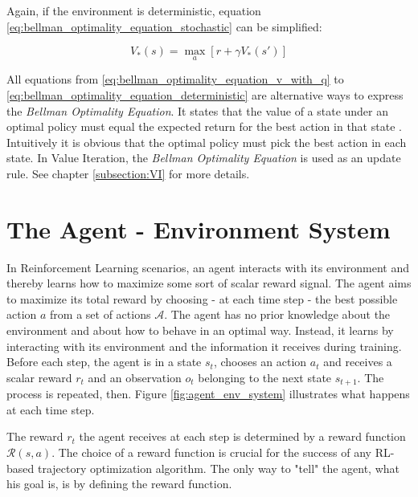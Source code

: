 Again, if the environment is deterministic, equation \ref{eq:bellman_optimality_equation_stochastic} can be simplified:

\begin{equation}
V_*(s) = \max_a[r+\gamma V_*(s')]
\label{eq:bellman_optimality_equation_deterministic}
\end{equation}

All equations from \ref{eq:bellman_optimality_equation_v_with_q} to \ref{eq:bellman_optimality_equation_deterministic} are alternative ways to express the \textit{Bellman Optimality Equation}. It states that the value of a state under an optimal policy must equal the expected return for the best action in that state \cite{SuttonBarto2018}. Intuitively it is obvious that the optimal policy must pick the best action in each state. In Value Iteration, the \textit{Bellman Optimality Equation} is used as an update rule. See chapter \ref{subsection:VI} for more details.

\section{The Agent - Environment System}

In Reinforcement Learning scenarios, an agent interacts with its environment and thereby learns how to maximize some sort of scalar reward signal. The agent aims to maximize its total reward by choosing - at each time step - the best possible action $a$ from a set of actions $\mathcal{A}$. 
The agent has no prior knowledge about the environment and about how to behave in an optimal way. Instead, it learns by interacting with its environment and the information it receives during training. Before each step, the agent is in a state $s_t$, chooses an action $a_t$ and receives a scalar reward $r_t$ and an observation $o_t$ belonging to the next state $s_{t+1}$. The process is repeated, then. Figure \ref{fig:agent_env_system} illustrates what happens at each time step.

The reward $r_t$ the agent receives at each step is determined by a reward function $\mathcal{R}(s,a)$. The choice of a reward function is crucial for the success of any RL-based trajectory optimization algorithm. The only way to "tell" the agent, what his goal is, is by defining the reward function. 

